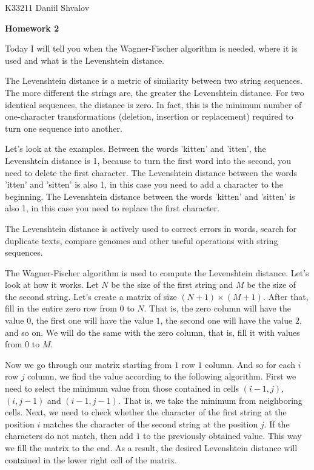 \documentclass[a4paper, 14pt]{extarticle}
\begin{document}
\begin{flushright}
  K33211 Daniil Shvalov
\end{flushright}

\begin{center}
  \textbf{Homework 2}
\end{center}

Today I will tell you when the Wagner-Fischer algorithm is needed, where it is
used and what is the Levenshtein distance.

The Levenshtein distance is a metric of similarity between two string sequences.
The more different the strings are, the greater the Levenshtein distance. For
two identical sequences, the distance is zero. In fact, this is the minimum
number of one-character transformations (deletion, insertion or replacement)
required to turn one sequence into another.

Let's look at the examples. Between the words 'kitten' and 'itten', the
Levenshtein distance is 1, because to turn the first word into the second, you
need to delete the first character. The Levenshtein distance between the words
'itten' and 'sitten' is also 1, in this case you need to add a character to the
beginning. The Levenshtein distance between the words 'kitten' and 'sitten' is
also 1, in this case you need to replace the first character.

The Levenshtein distance is actively used to correct errors in words, search for
duplicate texts, compare genomes and other useful operations with string
sequences.

The Wagner-Fischer algorithm is used to compute the Levenshtein distance. Let's
look at how it works. Let \(N\) be the size of the first string and \(M\) be the
size of the second string. Let's create a matrix of size \((N + 1) \times (M +
1)\). After that, fill in the entire zero row from \(0\) to \(N\). That is, the
zero column will have the value \(0\), the first one will have the value \(1\),
the second one will have the value \(2\), and so on. We will do the same with
the zero column, that is, fill it with values from \(0\) to \(M\).

Now we go through our matrix starting from \(1\) row \(1\) column. And so for
each \(i\) row \(j\) column, we find the value according to the following
algorithm. First we need to select the minimum value from those contained in
cells \((i - 1, j)\), \((i, j - 1)\) and \((i - 1, j - 1)\). That is, we take
the minimum from neighboring cells. Next, we need to check whether the character
of the first string at the position \(i\) matches the character of the second
string at the position \(j\). If the characters do not match, then add \(1\) to
the previously obtained value. This way we fill the matrix to the end. As a
result, the desired Levenshtein distance will contained in the lower right cell
of the matrix.
\end{document}
